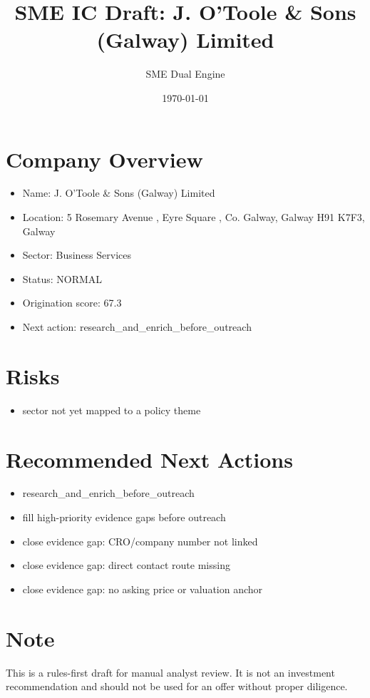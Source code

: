 \documentclass[11pt,a4paper]{article}
\title{SME IC Draft: J. O'Toole \& Sons (Galway) Limited}
\author{SME Dual Engine}
\date{\today}
\begin{document}
\maketitle
\section*{Company Overview}
\begin{itemize}[leftmargin=1.4em]
\item Name: J. O'Toole \& Sons (Galway) Limited
\item Location: 5 Rosemary Avenue , Eyre Square , Co. Galway, Galway H91 K7F3, Galway
\item Sector: Business Services
\item Status: NORMAL
\item Origination score: 67.3
\item Next action: research\_and\_enrich\_before\_outreach
\end{itemize}
\section*{Risks}
\begin{itemize}[leftmargin=1.4em]
\item sector not yet mapped to a policy theme
\end{itemize}
\section*{Recommended Next Actions}
\begin{itemize}[leftmargin=1.4em]
\item research\_and\_enrich\_before\_outreach
\item fill high-priority evidence gaps before outreach
\item close evidence gap: CRO/company number not linked
\item close evidence gap: direct contact route missing
\item close evidence gap: no asking price or valuation anchor
\end{itemize}
\section*{Note}
This is a rules-first draft for manual analyst review. It is not an investment
recommendation and should not be used for an offer without proper diligence.
\end{document}
